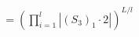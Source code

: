 \documentclass[preview]{standalone}
\begin{document}
\begin{align*}
\quad\\   &= \left(\prod_{i=1}^{l}\left|\left(S_3\right)_{1}\cdot 2\right|\right)^{L/l}
\end{align*}
\end{document}
